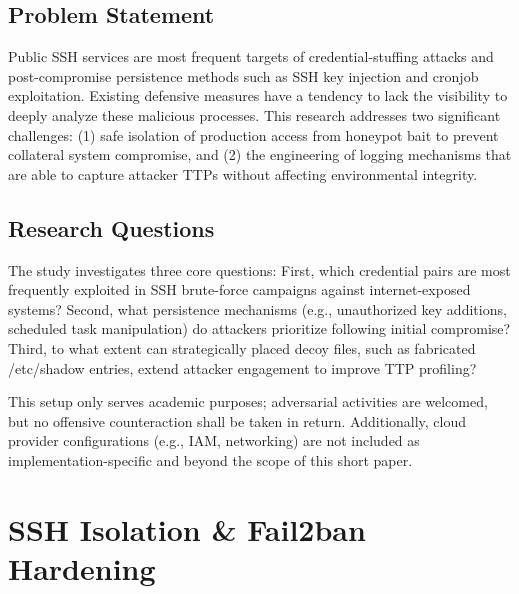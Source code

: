 \documentclass{cls/ULBreport}
\begin{document}
        \subsection{Problem Statement} 
        Public SSH services are most frequent targets of credential-stuffing attacks and post-compromise persistence methods such as SSH key injection and cronjob exploitation. Existing defensive measures have a tendency to lack the visibility to deeply analyze these malicious processes. This research addresses two significant challenges: (1) safe isolation of production access from honeypot bait to prevent collateral system compromise, and (2) the engineering of logging mechanisms that are able to capture attacker TTPs without affecting environmental integrity.

        \subsection{Research Questions}
        The study investigates three core questions: First, which credential pairs are most frequently exploited in SSH brute-force campaigns against internet-exposed systems? Second, what persistence mechanisms (e.g., unauthorized key additions, scheduled task manipulation) do attackers prioritize following initial compromise? Third, to what extent can strategically placed decoy files, such as fabricated /etc/shadow entries, extend attacker engagement to improve TTP profiling?

    \begin{tcolorbox}[  
        colback=red!5!white,  
        colframe=red!75!black,  
        title={\textbf{\textcolor{black}{Security Disclaimer}}},
        fontupper=\small,  
        sharp corners  
    ]  
    This setup only serves academic purposes; adversarial activities are welcomed, but no offensive counteraction shall be taken in return. Additionally, cloud provider configurations (e.g., IAM, networking) are not included as implementation-specific and beyond the scope of this short paper.  
    \end{tcolorbox}  

        
    \section{SSH Isolation \& Fail2ban Hardening}
\end{document}
